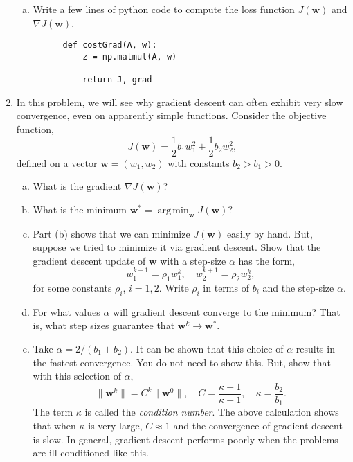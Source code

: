 \documentclass[11pt]{article}
\def\argmin{\mathop{\mathrm{arg\,min}}}
\def\arr{\rightarrow}
\newcommand{\wbf}{\mathbf{w}}
\begin{document}
\begin{enumerate}
\begin{enumerate}[(a)]
\item Write a few lines of python code to compute the loss function $J(\wbf)$ and
$\nabla J(\wbf)$.

      \begin{lstlisting}
      def costGrad(A, w):
          z = np.matmul(A, w)
          
          return J, grad
      \end{lstlisting}

\end{enumerate}

\item In this problem, we will see why gradient descent can often exhibit
very slow convergence, even on apparently simple functions.
Consider the objective function,
\[
    J(\wbf) = \frac{1}{2}b_1w_1^2 + \frac{1}{2}b_2w_2^2,
\]
defined on a vector $\wbf=(w_1,w_2)$ with constants $b_2 > b_1 > 0$.
\begin{enumerate}[(a)]
  \item What is the gradient $\nabla J(\wbf)$?
  \item What is the minimum $\wbf^* = \argmin_{\wbf} J(\wbf)$?
  \item Part (b) shows that we can minimize $J(\wbf)$ easily by hand.
  But, suppose we tried to minimize it via gradient descent.
  Show that the gradient descent update of $\wbf$ with a step-size $\alpha$
has the form,
\[
    w_1^{k+1} = \rho_1 w_1^k, \quad w_2^{k+1} = \rho_2 w_2^k,
\]
for some constants $\rho_i$, $i=1,2$.  Write $\rho_i$ in terms of
$b_i$ and the step-size $\alpha$.
  \item For what values $\alpha$ will gradient descent converge to the minimum? That is, what step sizes guarantee that $\wbf^k \arr \wbf^*$.

\item Take $\alpha = 2/(b_1+b_2)$.  It can be shown that this choice of $\alpha$ results in the fastest convergence.  You do not need to show this.
But, show that with this selection of $\alpha$,
\[
    \|\wbf^k\| = C^k \|\wbf^0\|, \quad C = \frac{\kappa-1}{\kappa+1 }, \quad
    \kappa = \frac{b_2}{b_1}.
\]
The term $\kappa$ is called the \emph{condition number}.  The above calculation
shows that when $\kappa$ is very large, $C \approx 1$ and the convergence
of gradient descent is slow.  In general, gradient descent performs poorly
when the problems are ill-conditioned like this.
\end{enumerate}


\end{enumerate}
\end{document}
